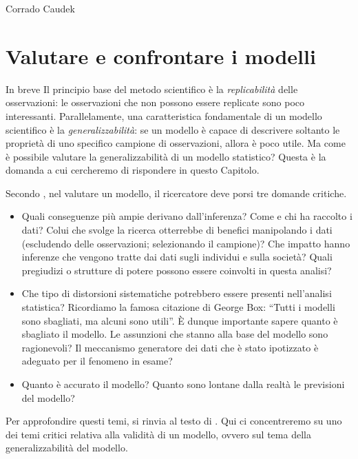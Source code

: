 \documentclass[
  10pt,
  italian,
  a4paper,
  extrafontsizes,onecolumn,openright
  ]{memoir}
\newenvironment{Summary}
  {\begin{bclogo}[logo=\bctrombone, noborder=true, couleur=lightgray!50]{In breve}\parindent0pt}
  {\end{bclogo}}
\theoremstyle{definition}
\theoremstyle{definition}
\theoremstyle{definition}
\theoremstyle{definition}
\theoremstyle{remark}
\begin{document}
\bigskip

Corrado Caudek

\mainmatter

\hypertarget{loo-stan}{%
\chapter{Valutare e confrontare i modelli}\label{loo-stan}}

\begin{Summary}
Il principio base del metodo scientifico è la \emph{replicabilità} delle
osservazioni: le osservazioni che non possono essere replicate sono poco
interessanti. Parallelamente, una caratteristica fondamentale di un
modello scientifico è la \emph{generalizzabilità}: se un modello è
capace di descrivere soltanto le proprietà di uno specifico campione di
osservazioni, allora è poco utile. Ma come è possibile valutare la
generalizzabilità di un modello statistico? Questa è la domanda a cui
cercheremo di rispondere in questo Capitolo.
\end{Summary}

Secondo \textcite{Johnson2022bayesrules}, nel valutare un modello, il ricercatore deve porsi tre domande critiche.

\begin{itemize}
\item
  Quali conseguenze più ampie derivano dall'inferenza? Come e chi ha raccolto i dati? Colui che svolge la ricerca otterrebbe di benefici manipolando i dati (escludendo delle osservazioni; selezionando il campione)? Che impatto hanno inferenze che vengono tratte dai dati sugli individui e sulla società? Quali pregiudizi o strutture di potere possono essere coinvolti in questa analisi?
\item
  Che tipo di distorsioni sistematiche potrebbero essere presenti nell'analisi statistica? Ricordiamo la famosa citazione di George Box: ``Tutti i modelli sono sbagliati, ma alcuni sono utili''. È dunque importante sapere quanto è sbagliato il modello. Le assunzioni che stanno alla base del modello sono ragionevoli? Il meccanismo generatore dei dati che è stato ipotizzato è adeguato per il fenomeno in esame?
\item
  Quanto è accurato il modello? Quanto sono lontane dalla realtà le previsioni del modello?
\end{itemize}

Per approfondire questi temi, si rinvia al testo di \textcite{Johnson2022bayesrules}. Qui ci concentreremo su uno dei temi critici relativa alla validità di un modello, ovvero sul tema della generalizzabilità del modello.
\end{document}
